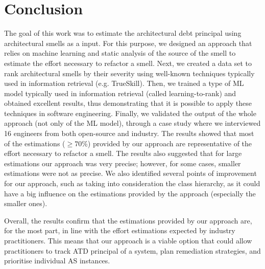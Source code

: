 
\section{Conclusion}\label{c6:sec:conclusion-fw}
The goal of this work was to estimate the architectural debt principal using architectural smells as a input.
For this purpose, we designed an approach that relies on machine learning and static analysis of the source of the smell to estimate the effort necessary to refactor a smell.
Next, we created a data set to rank architectural smells by their severity using well-known techniques typically used in information retrieval (e.g. TrueSkill).
Then, we trained a type of ML model typically used in information retrieval (called learning-to-rank) and obtained excellent results, thus demonstrating that it is possible to apply these techniques in software engineering.
Finally, we validated the output of the whole approach (not only of the ML model), through a case study where we interviewed 16 engineers from both open-source and industry.
The results showed that most of the estimations ($\ge 70$\%) provided by our approach are representative of the effort necessary to refactor a smell.
The results also suggested that for large estimations our approach was very precise; however, for some cases, smaller estimations were not as precise.
We also identified several points of improvement for our approach, such as taking into consideration the class hierarchy, as it could have a big influence on the estimations provided by the approach (especially the smaller ones).

Overall, the results confirm that the estimations provided by our approach are, for the most part, in line with the effort estimations expected by industry practitioners.
This means that our approach is a viable option that could allow practitioners to track ATD principal of a system, plan remediation strategies, and prioritise individual AS instances.

